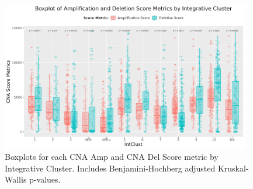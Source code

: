 \begin{figure}[!ht]
\center
\includegraphics[width=0.97\textwidth]{../figures/Chapter_2/Global_CNA_Score_AmpDel_Across_IC.png}
\caption[Boxplots for each CNA Amp and CNA Del Score metric by Integrative Cluster.]{Boxplots for each CNA Amp and CNA Del Score metric by Integrative Cluster. Includes Benjamini-Hochberg adjusted Kruskal-Wallis p-values.}
\label{fig:CNA-Score-Metric-Boxplots-IC-AmpDel}
\end{figure}

